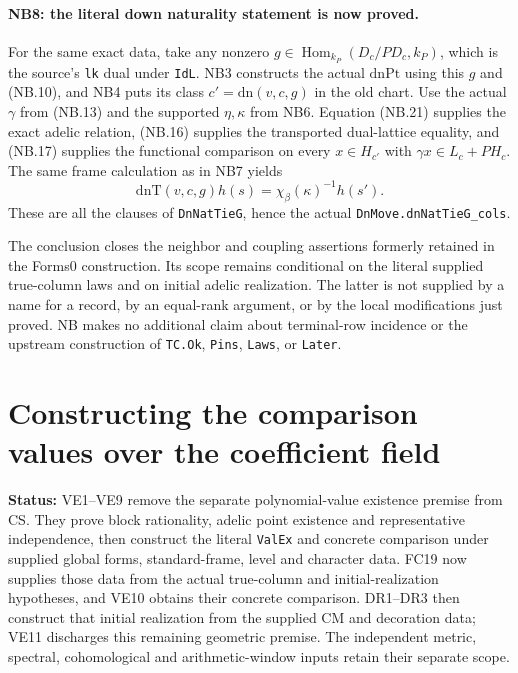 \documentclass[11pt,a4paper]{article}
\numberwithin{equation}{section}
\theoremstyle{remark}\newtheorem{remark}[theorem]{Remark}
\newcommand{\status}[1]{\textbf{Status:} #1}
\begin{document}
\paragraph{NB8: the literal down naturality statement is now proved.}
For the same exact data, take any nonzero
$g\in\operatorname{Hom}_{k_P}(D_c/PD_c,k_P)$, which is the source's
\texttt{lk} dual under \texttt{IdL}. NB3 constructs the actual
$\mathrm{dnPt}$ using this $g$ and (NB.10), and NB4 puts its class
$c'=\mathrm{dn}(v,c,g)$ in the old chart. Use the actual $\gamma$
from (NB.13) and the supported $\eta,\kappa$ from NB6.
Equation (NB.21) supplies the exact adelic relation, (NB.16) supplies
the transported dual-lattice equality, and (NB.17) supplies the
functional comparison on every $x\in H_{c'}$ with
$\gamma x\in L_c+PH_c$. The same frame calculation as in NB7 yields
\[
                  \mathrm{dnT}(v,c,g)h(s)
                      =\chi_\beta(\kappa)^{-1}h(s'). \tag{NB.23}
\]
These are all the clauses of \texttt{DnNatTieG}, hence the actual
\texttt{DnMove.dnNatTieG\_\allowbreak cols}.

The conclusion closes the neighbor and coupling assertions formerly
retained in the Forms0 construction. Its scope remains conditional on
the literal supplied true-column laws and on initial adelic realization.
The latter is not supplied by a name for a record, by an equal-rank
argument, or by the local modifications just proved. NB makes no
additional claim about terminal-row incidence or the upstream
construction of \texttt{TC.Ok}, \texttt{Pins}, \texttt{Laws}, or
\texttt{Later}.


\section{Constructing the comparison values over the coefficient field}
\label{sec:value-existence}

\status{VE1--VE9 remove the separate polynomial-value existence premise
from CS. They prove block rationality, adelic point existence and
representative independence, then construct the literal \texttt{ValEx}
and concrete comparison under supplied global forms, standard-frame,
level and character data. FC19 now supplies those data from the actual
true-column and initial-realization hypotheses, and VE10 obtains their
concrete comparison. DR1--DR3 then construct that initial realization
from the supplied CM and decoration data; VE11 discharges this remaining
geometric premise. The independent metric, spectral, cohomological
and arithmetic-window inputs retain their separate scope.}
\end{document}
